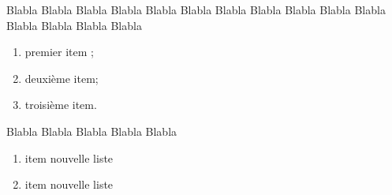 \documentclass[12pt,a4paper]{article}
\begin{document}
Blabla Blabla Blabla Blabla Blabla Blabla Blabla Blabla Blabla Blabla
Blabla Blabla Blabla Blabla Blabla
\begin{enumerate}[label=\arabic*)]
\item premier item ;
\item deuxième item;
\item troisième item.
\end{enumerate}
Blabla Blabla Blabla Blabla Blabla
\begin{enumerate}[label=\arabic*),resume]
\item item nouvelle liste
\item item nouvelle liste
\end{enumerate}
\end{document}
